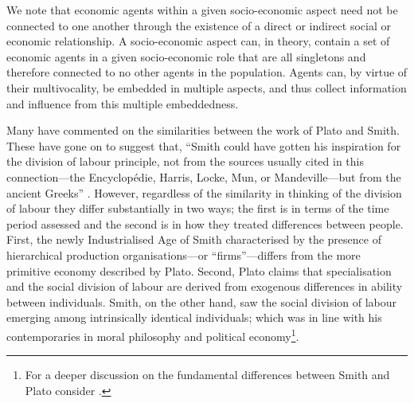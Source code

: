 We note that economic agents within a given socio-economic aspect need not be connected to one another through the existence of a direct or indirect social or economic relationship. A socio-economic aspect can, in theory, contain a set of economic agents in a given socio-economic role that are all singletons and therefore connected to no other agents in the population. Agents can, by virtue of their multivocality, be embedded in multiple aspects, and thus collect information and influence from this multiple embeddedness.

\medskip \noindent Many have commented on the similarities between the work of Plato and Smith. These have gone on to suggest that, ``Smith could have gotten his inspiration for the division of labour principle, not from the sources usually cited in this connection---the Encyclop\'{e}die, Harris, Locke, Mun, or Mandeville---but from the ancient Greeks'' \citep[p.~221--222]{Foley1974}. However, regardless of the similarity in thinking of the division of labour they differ substantially in two ways; the first is in terms of the time period assessed and the second is in how they treated differences between people. First, the newly Industrialised Age of Smith characterised by the presence of hierarchical production organisations---or ``firms''---differs from the more primitive economy described by Plato. Second, Plato claims that specialisation and the social division of labour are derived from exogenous differences in ability between individuals. Smith, on the other hand, saw the social division of labour emerging among intrinsically identical individuals; which was in line with his contemporaries in moral philosophy and political economy\footnote{For a deeper discussion on the fundamental differences between Smith and Plato consider \citep{McNulty1975}.}.




